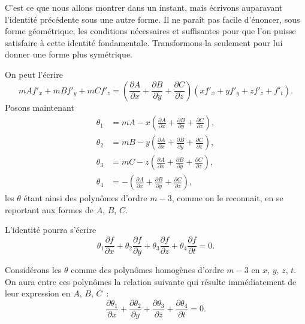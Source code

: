 \documentclass{article}
\begin{document}
C'est ce que nous allons montrer dans un instant, mais écrivons auparavant l'identité précédente sous une autre forme. Il ne paraît pas facile d'énoncer, sous forme géométrique, les conditions nécessaires et suffisantes pour que l'on puisse satisfaire à cette identité fondamentale. Transformons-la seulement pour lui donner une forme plus symétrique.

On peut l'écrire
\[
m A f'_{x} + m B f'_{y} + m C f'_{z} = \left( \frac{\partial A}{\partial x} + \frac{\partial B}{\partial y} + \frac{\partial C}{\partial z} \right) (x f'_{x} + y f'_{y} + z f'_{z} + f'_{t}).
\]
Posons maintenant
\[
\begin{aligned}
\theta_{1} &= m A - x \left( \frac{\partial A}{\partial x} + \frac{\partial B}{\partial y} + \frac{\partial C}{\partial z} \right), \\
\theta_{2} &= m B - y \left( \frac{\partial A}{\partial x} + \frac{\partial B}{\partial y} + \frac{\partial C}{\partial z} \right), \\
\theta_{3} &= m C - z \left( \frac{\partial A}{\partial x} + \frac{\partial B}{\partial y} + \frac{\partial C}{\partial z} \right), \\
\theta_{4} &= - \left( \frac{\partial A}{\partial x} + \frac{\partial B}{\partial y} + \frac{\partial C}{\partial z} \right),
\end{aligned}
\]
les $\theta$ étant ainsi des polynômes d'ordre $m - 3$, comme on le reconnait, en se reportant aux formes de $A$, $B$, $C$.

L'identité pourra s'écrire
\[
\theta_{1} \frac{\partial f}{\partial x} + \theta_{2} \frac{\partial f}{\partial y} + \theta_{3} \frac{\partial f}{\partial z} + \theta_{4} \frac{\partial f}{\partial t} = 0. \tag{1}
\]

Considérons les $\theta$ comme des polynômes homogènes d'ordre $m - 3$ en $x$, $y$, $z$, $t$. On aura entre ces polynômes la relation suivante qui résulte immédiatement de leur expression en $A$, $B$, $C$~:
\[
\frac{\partial \theta_{1}}{\partial x} + \frac{\partial \theta_{2}}{\partial y} + \frac{\partial \theta_{3}}{\partial z} + \frac{\partial \theta_{4}}{\partial t} = 0.
\]
\end{document}
